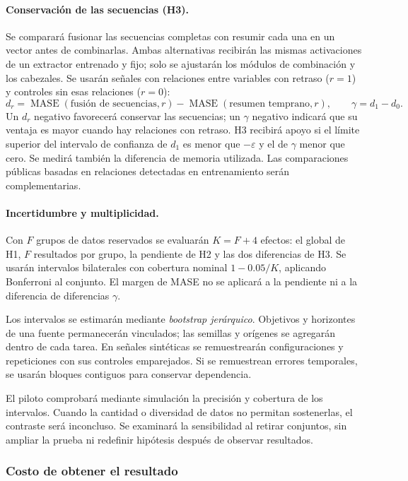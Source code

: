 \documentclass[11pt,letterpaper]{article}
\begin{document}
\paragraph{Conservación de las secuencias (H3).}
Se comparará fusionar las secuencias completas con resumir cada una en un vector antes de combinarlas. Ambas alternativas recibirán las mismas activaciones de un extractor entrenado y fijo; solo se ajustarán los módulos de combinación y los cabezales. Se usarán señales con relaciones entre variables con retraso ($r=1$) y controles sin esas relaciones ($r=0$):
\[
d_r=\operatorname{MASE}(\text{fusión de secuencias},r)
-\operatorname{MASE}(\text{resumen temprano},r),
\qquad \gamma=d_1-d_0.
\]
Un $d_r$ negativo favorecerá conservar las secuencias; un $\gamma$ negativo indicará que su ventaja es mayor cuando hay relaciones con retraso. H3 recibirá apoyo si el límite superior del intervalo de confianza de $d_1$ es menor que $-\varepsilon$ y el de $\gamma$ menor que cero. Se medirá también la diferencia de memoria utilizada. Las comparaciones públicas basadas en relaciones detectadas en entrenamiento serán complementarias.

\paragraph{Incertidumbre y multiplicidad.}
Con $F$ grupos de datos  reservados se evaluarán $K=F+4$ efectos: el global de H1, $F$ resultados por grupo, la pendiente de H2 y las dos diferencias de H3. Se usarán intervalos bilaterales con cobertura nominal $1-0.05/K$, aplicando Bonferroni al conjunto. El margen de MASE no se aplicará a la pendiente ni a la diferencia de diferencias $\gamma$.

Los intervalos se estimarán mediante \emph{bootstrap jerárquico}.  Objetivos y horizontes de una fuente permanecerán vinculados; las semillas y orígenes se agregarán dentro de cada tarea. En señales sintéticas se remuestrearán configuraciones y repeticiones con sus controles emparejados. Si se remuestrean errores temporales, se usarán bloques contiguos para conservar dependencia.

El piloto comprobará mediante simulación la precisión y cobertura de los intervalos. Cuando la cantidad o diversidad de datos no permitan sostenerlas, el contraste será inconcluso. Se examinará la sensibilidad al retirar conjuntos, sin ampliar la prueba ni redefinir hipótesis después de observar resultados.

\subsubsection{Costo de obtener el resultado}
\end{document}
